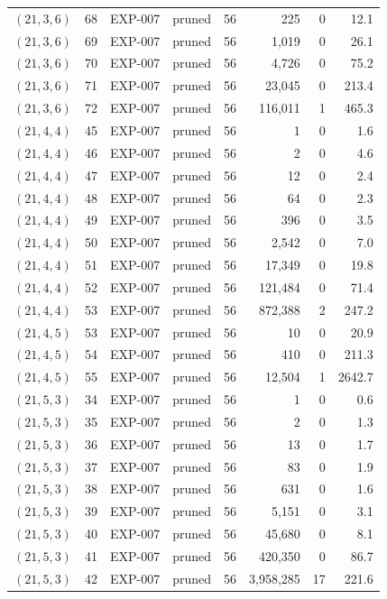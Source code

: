 \begin{longtable}{lrllrrrr}
$(21,3,6)$ & 68 & EXP-007 & pruned & 56 & 225 & 0 & 12.1 \\
$(21,3,6)$ & 69 & EXP-007 & pruned & 56 & 1{,}019 & 0 & 26.1 \\
$(21,3,6)$ & 70 & EXP-007 & pruned & 56 & 4{,}726 & 0 & 75.2 \\
$(21,3,6)$ & 71 & EXP-007 & pruned & 56 & 23{,}045 & 0 & 213.4 \\
$(21,3,6)$ & 72 & EXP-007 & pruned & 56 & 116{,}011 & 1 & 465.3 \\
$(21,4,4)$ & 45 & EXP-007 & pruned & 56 & 1 & 0 & 1.6 \\
$(21,4,4)$ & 46 & EXP-007 & pruned & 56 & 2 & 0 & 4.6 \\
$(21,4,4)$ & 47 & EXP-007 & pruned & 56 & 12 & 0 & 2.4 \\
$(21,4,4)$ & 48 & EXP-007 & pruned & 56 & 64 & 0 & 2.3 \\
$(21,4,4)$ & 49 & EXP-007 & pruned & 56 & 396 & 0 & 3.5 \\
$(21,4,4)$ & 50 & EXP-007 & pruned & 56 & 2{,}542 & 0 & 7.0 \\
$(21,4,4)$ & 51 & EXP-007 & pruned & 56 & 17{,}349 & 0 & 19.8 \\
$(21,4,4)$ & 52 & EXP-007 & pruned & 56 & 121{,}484 & 0 & 71.4 \\
$(21,4,4)$ & 53 & EXP-007 & pruned & 56 & 872{,}388 & 2 & 247.2 \\
$(21,4,5)$ & 53 & EXP-007 & pruned & 56 & 10 & 0 & 20.9 \\
$(21,4,5)$ & 54 & EXP-007 & pruned & 56 & 410 & 0 & 211.3 \\
$(21,4,5)$ & 55 & EXP-007 & pruned & 56 & 12{,}504 & 1 & 2642.7 \\
$(21,5,3)$ & 34 & EXP-007 & pruned & 56 & 1 & 0 & 0.6 \\
$(21,5,3)$ & 35 & EXP-007 & pruned & 56 & 2 & 0 & 1.3 \\
$(21,5,3)$ & 36 & EXP-007 & pruned & 56 & 13 & 0 & 1.7 \\
$(21,5,3)$ & 37 & EXP-007 & pruned & 56 & 83 & 0 & 1.9 \\
$(21,5,3)$ & 38 & EXP-007 & pruned & 56 & 631 & 0 & 1.6 \\
$(21,5,3)$ & 39 & EXP-007 & pruned & 56 & 5{,}151 & 0 & 3.1 \\
$(21,5,3)$ & 40 & EXP-007 & pruned & 56 & 45{,}680 & 0 & 8.1 \\
$(21,5,3)$ & 41 & EXP-007 & pruned & 56 & 420{,}350 & 0 & 86.7 \\
$(21,5,3)$ & 42 & EXP-007 & pruned & 56 & 3{,}958{,}285 & 17 & 221.6 \\

\end{longtable}
